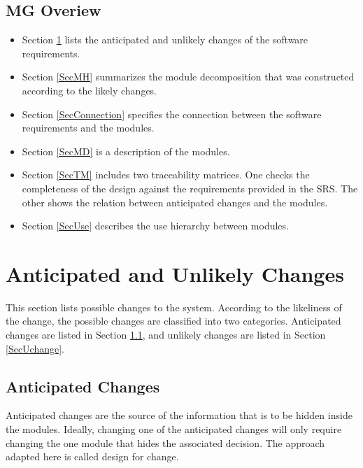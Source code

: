 \documentclass[12pt, titlepage]{article}
\begin{document}
\subsection{MG Overiew}
\begin{itemize}
	\item Section \ref{SecChange} lists the anticipated and unlikely changes of the software requirements. 
	\item Section \ref{SecMH} summarizes the module decomposition that was constructed according to the likely changes. 
	\item Section \ref{SecConnection} specifies the connection between the software requirements and the modules. \item Section \ref{SecMD} is a description of the modules. 
	\item Section \ref{SecTM} includes two traceability matrices. One checks the completeness of the design against the requirements provided in the SRS. The other shows the relation between anticipated changes and the modules. 
	\item Section \ref{SecUse} describes the use hierarchy between modules. 
\end{itemize}

\section{Anticipated and Unlikely Changes} \label{SecChange}

This section lists possible changes to the system. According to the likeliness
of the change, the possible changes are classified into two
categories. Anticipated changes are listed in Section \ref{SecAchange}, and
unlikely changes are listed in Section \ref{SecUchange}.

\subsection{Anticipated Changes} \label{SecAchange}

Anticipated changes are the source of the information that is to be hidden
inside the modules. Ideally, changing one of the anticipated changes will only
require changing the one module that hides the associated decision. The approach
adapted here is called design for
change.
\end{document}

